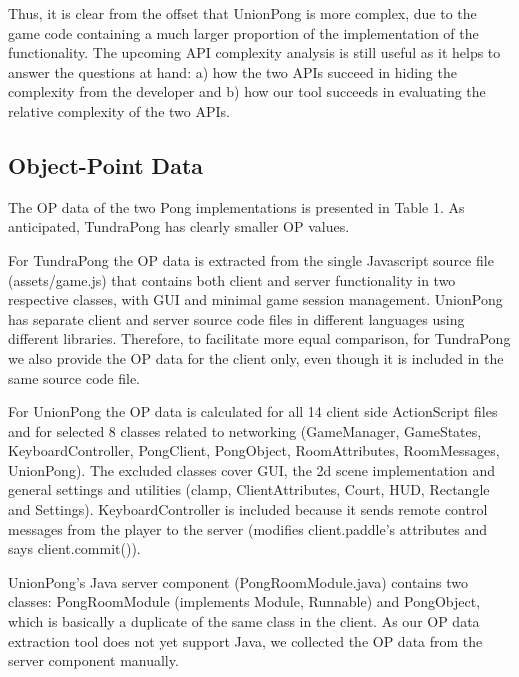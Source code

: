 \documentclass[conference]{IEEEtran}
\begin{document}

Thus, it is clear from the offset that UnionPong is more complex, due
to the game code containing a much larger proportion of the
implementation of the functionality. The upcoming API complexity
analysis is still useful as it helps to answer the questions at
hand: a) how the two APIs succeed in hiding the complexity from the
developer and b) how our tool succeeds in evaluating the relative
complexity of the two APIs.


\subsection{Object-Point Data%
  \label{object-point-data}%
}

The OP data of the two Pong implementations is presented in
Table 1. As anticipated, TundraPong has clearly smaller OP values.

For TundraPong the OP data is extracted from the single Javascript
source file (assets/game.js) that contains both client and server
functionality in two respective classes, with GUI and minimal game
session management. UnionPong has separate client and server source
code files in different languages using different
libraries. Therefore, to facilitate more equal comparison, for
TundraPong we also provide the OP data for the client only, even
though it is included in the same source code file.

For UnionPong the OP data is calculated for all 14 client side
ActionScript files and for selected 8 classes related to networking
(GameManager, GameStates, KeyboardController, PongClient, PongObject,
RoomAttributes, RoomMessages, UnionPong). The excluded classes cover
GUI, the 2d scene implementation and general settings and utilities
(clamp, ClientAttributes, Court, HUD, Rectangle and
Settings). KeyboardController is included because it sends remote
control messages from the player to the server (modifies
client.paddle's attributes and says client.commit()).

UnionPong’s Java server component (PongRoomModule.java) contains two
classes: PongRoomModule (implements Module, Runnable) and PongObject,
which is basically a duplicate of the same class in the client. As our
OP data extraction tool does not yet support Java, we collected the OP
data from the server component manually.
\end{document}
